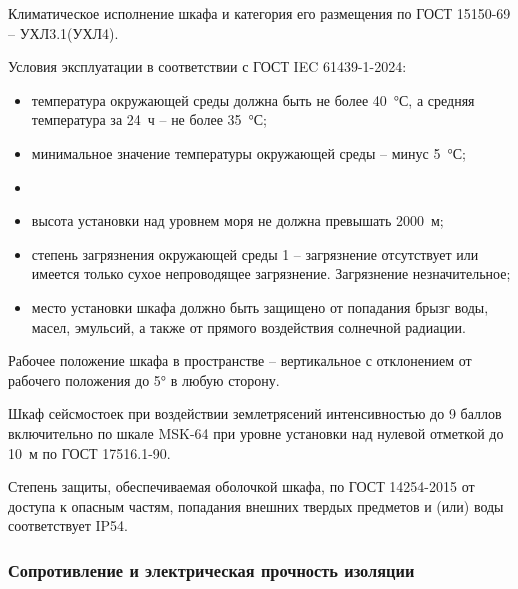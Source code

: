\begin{enumsubsub}
\item Климатическое исполнение шкафа и категория его размещения по ГОСТ 15150-69 – УХЛ3.1(УХЛ4).
\item Условия эксплуатации в соответствии с ГОСТ IEC 61439-1-2024:
  \begin{itemize}
  \item температура окружающей среды должна быть не более 40~°С, а средняя температура за 24~ч -- не более 35~°С;
  \item минимальное значение температуры окружающей среды -- минус 5~°С;
  \item {}
  \item высота установки над уровнем моря не должна превышать 2000~м;
  \item степень загрязнения окружающей среды 1 -- загрязнение отсутствует или имеется только сухое непроводящее загрязнение. Загрязнение незначительное;
  \item место установки шкафа должно быть защищено от попадания брызг воды, масел, эмульсий, а также от прямого воздействия солнечной радиации.
  \end{itemize}
\item Рабочее положение шкафа в пространстве -- вертикальное с отклонением от рабочего положения до 5° в любую сторону.
\item {}
\item Шкаф сейсмостоек при воздействии землетрясений интенсивностью до 9 баллов включительно по шкале MSK-64 при уровне установки над нулевой отметкой до 10~м по ГОСТ 17516.1-90.
\item Степень защиты, обеспечиваемая оболочкой шкафа, по ГОСТ 14254-2015 от доступа к опасным частям, попадания внешних твердых предметов и (или) воды соответствует IP54.
\end{enumsubsub}

\subsubsection{Сопротивление и электрическая прочность изоляции}

